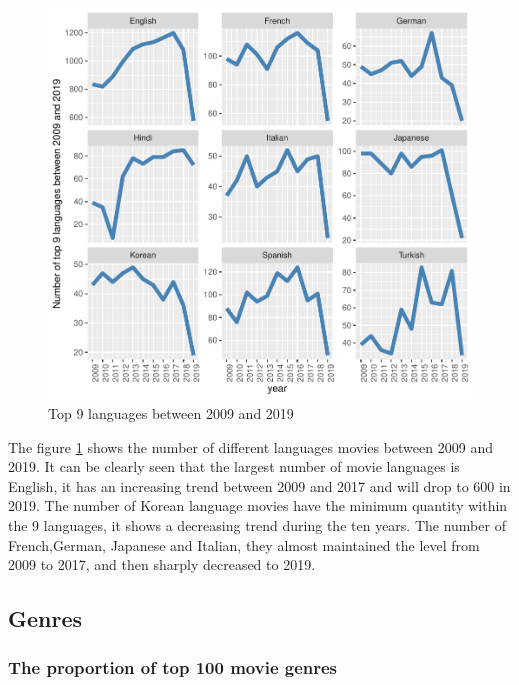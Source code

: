 \documentclass[11pt,a4paper,]{article}
\begin{document}
\begin{figure}
\centering
\includegraphics{Report_files/figure-latex/langyear-1.pdf}
\caption{\label{fig:langyear}Top 9 languages between 2009 and 2019}
\end{figure}

The figure \ref{fig:langyear} shows the number of different languages movies between 2009 and 2019. It can be clearly seen that the largest number of movie languages is English, it has an increasing trend between 2009 and 2017 and will drop to 600 in 2019. The number of Korean language movies have the minimum quantity within the 9 languages, it shows a decreasing trend during the ten years. The number of French,German, Japanese and Italian, they almost maintained the level from 2009 to 2017, and then sharply decreased to 2019.

\hypertarget{genres}{%
\subsection{Genres}\label{genres}}

\hypertarget{the-proportion-of-top-100-movie-genres}{%
\subsubsection{The proportion of top 100 movie genres}\label{the-proportion-of-top-100-movie-genres}}
\end{document}
